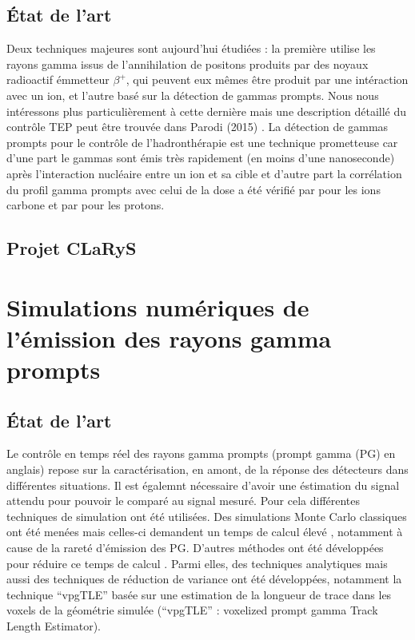\documentclass[11pt,a4paper,oldfontcommands]{memoir}
\begin{document}
\subsection{\'Etat de l'art}

Deux techniques majeures sont aujourd'hui étudiées : la première utilise les rayons gamma issus de l'annihilation de positons produits par des noyaux radioactif émmetteur $\beta^+$, qui peuvent eux mêmes être produit par une intéraction avec un ion, et l'autre basé sur la détection de gammas prompts. Nous nous intéressons plus particulièrement à cette dernière mais une description détaillé du contrôle TEP peut être trouvée dans Parodi (2015) \cite{Parodi20157153}. La détection de gammas prompts pour le contrôle de l'hadronthérapie est une technique prometteuse car d'une part le gammas sont émis très rapidement (en moins d'une nanoseconde) après l’interaction nucléaire entre un ion et sa cible et d'autre part la corrélation du profil gamma prompts avec celui de la dose a été vérifié par \cite{PGMonitoringC12}pour les ions carbone et par \cite{Min2006} pour les protons.  

\subsection{Projet CLaRyS}



\section{Simulations numériques de l'émission des rayons gamma prompts}

\subsection{\'Etat de l'art}

Le contrôle en temps réel des rayons gamma prompts (prompt gamma (PG) en anglais) repose sur la caractérisation, en amont, de la réponse des détecteurs dans différentes situations. Il est égalemnt nécessaire d'avoir une éstimation du signal attendu pour pouvoir le comparé au signal mesuré.  Pour cela différentes techniques de simulation ont été utilisées. Des simulations Monte Carlo classiques ont été menées mais celles-ci demandent un temps de calcul élevé \cite{KRIMMER201858}, notamment à cause de la rareté d'émission des PG. D'autres méthodes ont été développées pour réduire ce temps de calcul \cite{Qin_2017}. Parmi elles, des techniques analytiques \cite{Sterpin_2015} mais aussi des techniques de réduction de variance ont été développées, notamment la technique \enquote{vpgTLE} basée sur une estimation de la longueur de trace dans les voxels de la géométrie simulée (\enquote{vpgTLE} : voxelized prompt gamma Track Length Estimator).
\end{document}
